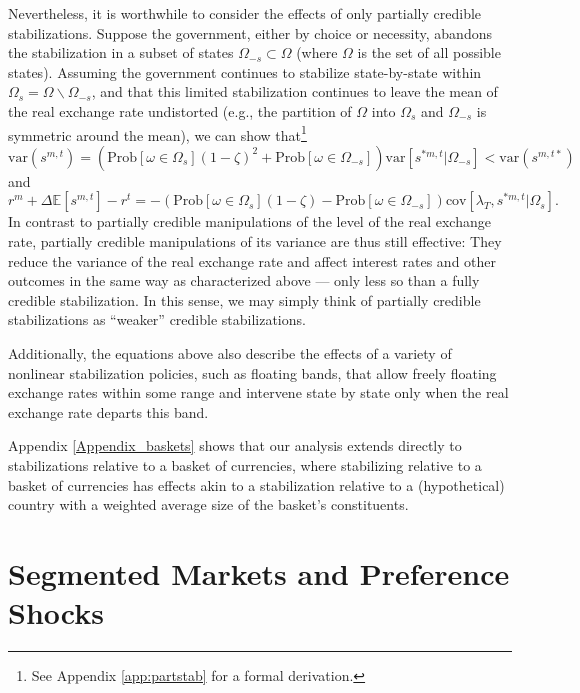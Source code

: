 \documentclass[12pt,letter]{article}
\theoremstyle{break} \theorembodyfont{\normalfont\itshape}
\theoremstyle{break}
\theoremstyle{break} \theorembodyfont{\normalfont\itshape}
\theoremstyle{break} \theorembodyfont{\normalfont\itshape}
\begin{document}
Nevertheless, it is worthwhile to consider the effects of only
partially credible stabilizations. Suppose the government, either by
choice or necessity, abandons the stabilization in a subset of states
$\Omega_{-s}\subset\Omega$ (where \(\Omega \) is the set of all
possible states). Assuming the government continues to stabilize
state-by-state within $\Omega_s=\Omega \backslash \Omega_{-s} $, and
that this limited stabilization continues to leave the mean of the
real exchange rate undistorted (e.g., the partition of $\Omega$ into
$\Omega_s$ and $\Omega_{-s}$ is symmetric around the mean), we can
show that\footnote{See Appendix \ref{app:partstab} for a formal
  derivation.}
\begin{equation*}
  \text{var}(s^{m,t})
  = \left(\text{Prob}\left[\omega\in\Omega_s\right] (1-\zeta)^2
    + \text{Prob}\left[\omega\in\Omega_{-s}\right] \right)
  \text{var}\left[s^{\ast m,t}|\Omega_{-s}\right]
  < \text{var}(s^{m,t*}) 
\end{equation*}
and
\begin{equation*}
  r^m+\Delta\mathbb{E}[s^{m,t}]-r^t
  = - \left(\text{Prob}\left[\omega\in\Omega_s\right] (1-\zeta)
    - \text{Prob}\left[\omega\in\Omega_{-s}\right] \right)
  \text{cov}\left[\lambda_T,s^{\ast m,t}|\Omega_s\right].
\end{equation*}
In contrast to partially credible manipulations of the level of the
real exchange rate, partially credible manipulations of its variance
are thus still effective: They reduce the variance of the real
exchange rate and affect interest rates and other outcomes in the same
way as characterized above --- only less so than a fully credible
stabilization. In this sense, we may simply think of partially
credible stabilizations as ``weaker'' credible stabilizations.

Additionally, the equations above also describe the
effects of a variety of nonlinear stabilization policies, such as
floating bands, that allow freely floating exchange rates within some range and intervene state by state only when the
real exchange rate departs this band.

Appendix \ref{Appendix_baskets} shows that our analysis extends directly to stabilizations relative to a basket of
currencies, where stabilizing relative to a basket of currencies has
effects akin to a stabilization relative to a (hypothetical) country
with a weighted average size of the basket's constituents.

\section{Segmented Markets and Preference
  Shocks \label{sec:full_model} \label{sec:generalizations}}
\end{document}
